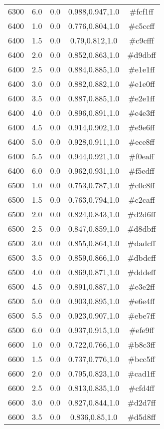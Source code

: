 \begin{tabular}{ccccc}
6300 & 6.0 & 0.0 & 0.988,0.947,1.0 & \#fcf1ff \\ 
6400 & 1.0 & 0.0 & 0.776,0.804,1.0 & \#c5ccff \\ 
6400 & 1.5 & 0.0 & 0.79,0.812,1.0 & \#c9cfff \\ 
6400 & 2.0 & 0.0 & 0.852,0.863,1.0 & \#d9dbff \\ 
6400 & 2.5 & 0.0 & 0.884,0.885,1.0 & \#e1e1ff \\ 
6400 & 3.0 & 0.0 & 0.882,0.882,1.0 & \#e1e0ff \\ 
6400 & 3.5 & 0.0 & 0.887,0.885,1.0 & \#e2e1ff \\ 
6400 & 4.0 & 0.0 & 0.896,0.891,1.0 & \#e4e3ff \\ 
6400 & 4.5 & 0.0 & 0.914,0.902,1.0 & \#e9e6ff \\ 
6400 & 5.0 & 0.0 & 0.928,0.911,1.0 & \#ece8ff \\ 
6400 & 5.5 & 0.0 & 0.944,0.921,1.0 & \#f0eaff \\ 
6400 & 6.0 & 0.0 & 0.962,0.931,1.0 & \#f5edff \\ 
6500 & 1.0 & 0.0 & 0.753,0.787,1.0 & \#c0c8ff \\ 
6500 & 1.5 & 0.0 & 0.763,0.794,1.0 & \#c2caff \\ 
6500 & 2.0 & 0.0 & 0.824,0.843,1.0 & \#d2d6ff \\ 
6500 & 2.5 & 0.0 & 0.847,0.859,1.0 & \#d8dbff \\ 
6500 & 3.0 & 0.0 & 0.855,0.864,1.0 & \#dadcff \\ 
6500 & 3.5 & 0.0 & 0.859,0.866,1.0 & \#dbdcff \\ 
6500 & 4.0 & 0.0 & 0.869,0.871,1.0 & \#dddeff \\ 
6500 & 4.5 & 0.0 & 0.891,0.887,1.0 & \#e3e2ff \\ 
6500 & 5.0 & 0.0 & 0.903,0.895,1.0 & \#e6e4ff \\ 
6500 & 5.5 & 0.0 & 0.923,0.907,1.0 & \#ebe7ff \\ 
6500 & 6.0 & 0.0 & 0.937,0.915,1.0 & \#efe9ff \\ 
6600 & 1.0 & 0.0 & 0.722,0.766,1.0 & \#b8c3ff \\ 
6600 & 1.5 & 0.0 & 0.737,0.776,1.0 & \#bcc5ff \\ 
6600 & 2.0 & 0.0 & 0.795,0.823,1.0 & \#cad1ff \\ 
6600 & 2.5 & 0.0 & 0.813,0.835,1.0 & \#cfd4ff \\ 
6600 & 3.0 & 0.0 & 0.827,0.844,1.0 & \#d2d7ff \\ 
6600 & 3.5 & 0.0 & 0.836,0.85,1.0 & \#d5d8ff \\ 

\end{tabular}
